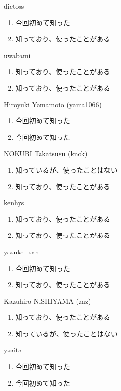 \begin{prework}{ dictoss }
  \begin{enumerate}
  \item 今回初めて知った
  \item 知っており、使ったことがある
  \end{enumerate}
\end{prework}

\begin{prework}{ uwabami }
  \begin{enumerate}
  \item 知っており、使ったことがある
  \item 知っており、使ったことがある
  \end{enumerate}
\end{prework}

\begin{prework}{ Hiroyuki Yamamoto (yama1066) }
  \begin{enumerate}
  \item 今回初めて知った
  \item 今回初めて知った
  \end{enumerate}
\end{prework}

\begin{prework}{ NOKUBI Takatsugu (knok) }
  \begin{enumerate}
  \item 知っているが、使ったことはない
  \item 知っており、使ったことがある
  \end{enumerate}
\end{prework}

\begin{prework}{ kenhys }
  \begin{enumerate}
  \item 知っており、使ったことがある
  \item 知っており、使ったことがある
  \end{enumerate}
\end{prework}

\begin{prework}{ yosuke\_san }
  \begin{enumerate}
  \item 今回初めて知った
  \item 知っており、使ったことがある
  \end{enumerate}
\end{prework}

\begin{prework}{ Kazuhiro NISHIYAMA (znz) }
  \begin{enumerate}
  \item 知っており、使ったことがある
  \item 知っているが、使ったことはない
  \end{enumerate}
\end{prework}

\begin{prework}{ ysaito }
  \begin{enumerate}
  \item 今回初めて知った
  \item 今回初めて知った
  \end{enumerate}
\end{prework}
